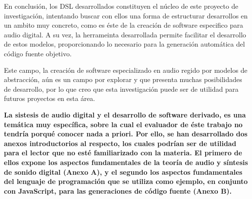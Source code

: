 En conclusión, los DSL desarrollados constituyen el núcleo de este proyecto de investigación, intentando buscar con ellos una forma de estructurar desarrollos en un ambito muy concreto, como es éste de la creación de software especifico para audio digital. A su vez, la herrameinta desarrollada permite facilitar el desarrollo de estos modelos, proporcionando lo necesario para la generación automática del código fuente objetivo.

Este campo, la creación de software especializado en audio regido por modelos de abstracción, aún es un campo por explorar y que presenta muchas posibilidades de desarrollo, por lo que creo que esta investigación puede ser de utilidad para futuros proyectos en esta área.

\begin{tcolorbox}[colback=gray!5,colframe=black,title=\textbf{Recomendación}]
\textbf{La sistesis de audio digital y el desarrollo de software derivado, es una temática muy específica, sobre la cual el evaluador de éste trabajo no tendría porqué conocer nada a priori. Por ello, se han desarrollado dos anexos introductorios al respecto, los cuales podrían ser de utilidad para el lector que no esté familiarizado con la materia. El primero de ellos expone los aspectos fundamentales de la teoría de audio y síntesis de sonido digital (Anexo A), y el segundo los aspectos fundamentales del lenguaje de programación que se utiliza como ejemplo, en conjunto con JavaScript, para las generaciones de código fuente (Anexo B).}
\end{tcolorbox}
